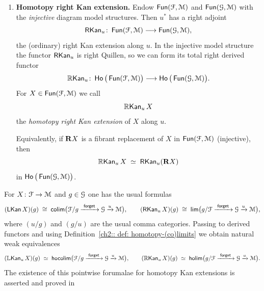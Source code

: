 \begin{definition}
\begin{enumerate}
    \item \textbf{Homotopy right Kan extension.}
    Endow $\operatorname{{\sf Fun}}(\mathcal F,\mathcal M)$ and $\operatorname{{\sf Fun}}(\mathcal G,\mathcal M)$ with the \emph{injective}
    diagram model structures. Then $u^{\ast}$ has a right adjoint
    \begin{equation}
      \operatorname{{\sf RKan}}_{u} \colon \operatorname{{\sf Fun}}(\mathcal F,\mathcal M) \longrightarrow \operatorname{{\sf Fun}}(\mathcal G,\mathcal M),
    \end{equation}
    the (ordinary) right Kan extension along $u$.
    In the injective model structure the functor $\operatorname{{\sf RKan}}_{u}$ is right
    Quillen, so we can form its total right derived functor
    \begin{equation}
      \operatorname{\mathbb{R}\mathsf{Kan}}_{u} \colon
      \operatorname{\sf Ho}\big(\operatorname{{\sf Fun}}(\mathcal F,\mathcal M)\big) \longrightarrow \operatorname{\sf Ho}\big(\operatorname{{\sf Fun}}(\mathcal G,\mathcal M)\big).
    \end{equation}
    For $X\in \operatorname{{\sf Fun}}(\mathcal F,\mathcal M)$ we call
    \begin{equation}
      \operatorname{\mathbb{R}\mathsf{Kan}}_{u} X
    \end{equation}
    the \emph{homotopy right Kan extension} of $X$ along $u$.

    Equivalently, if $\mathbf R X$ is a fibrant replacement of $X$ in
    $\operatorname{{\sf Fun}}(\mathcal F,\mathcal M)$ (injective), then
    \begin{equation}
      \operatorname{\mathbb{R}\mathsf{Kan}}_{u} X \;\simeq\; \operatorname{{\sf RKan}}_{u}(\mathbf R X)
    \end{equation}
    in $\operatorname{\sf Ho}\big(\operatorname{{\sf Fun}}(\mathcal G,\mathcal M)\big)$.
  \end{enumerate}
\end{definition}

\begin{remark}\label{ch2:: rem: pointwise-kan}
 For $X\colon \mathcal F\to\mathcal M$ and
  $g\in \mathcal G$ one has the usual formulas
  \begin{equation}
    (\operatorname{{\sf LKan}} X)(g) \;\cong\;
    \mathsf{colim}\big(\mathcal F/g \xrightarrow{\,\, \sf forget \,\,} \mathcal G \xrightarrow{u} \mathcal M \big),
    \qquad
    (\operatorname{{\sf RKan}}_{u}X)(g) \;\cong\;
    \mathsf{lim}\big(g/\mathcal F \xrightarrow{\,\, \sf forget \,\,} \mathcal G \xrightarrow{u} \mathcal M \big),
  \end{equation}
  where $(u/g)$ and $(g/u)$ are the usual comma categories.
  Passing to derived functors and using
  Definition~\textup{\ref{ch2:: def: homotopy-(co)limits}} we obtain
  natural weak equivalences
  \begin{equation}
    (\operatorname{\mathbb{L}\mathsf{Kan}}_u X)(g)
    \;\simeq\;
    \mathsf{hocolim}\big(\mathcal F/g \xrightarrow{\,\, \sf forget \,\,} \mathcal G \xrightarrow{u} \mathcal M \big),
    \qquad
    (\operatorname{\mathbb{R}\mathsf{Kan}}_{u} X)(g)
    \;\simeq\;
    \mathsf{holim}\big(g/\mathcal F \xrightarrow{\,\, \sf forget \,\,} \mathcal G \xrightarrow{u} \mathcal M \big).
  \end{equation}
  The existence of this pointwise forumalae for homotopy Kan extensions is asserted and proved in \cite[Proposition~1.14]{Cis09}
\end{remark}

